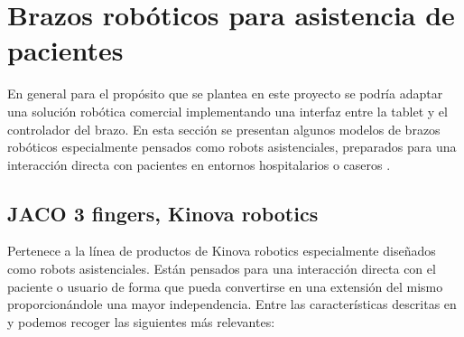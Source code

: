 \section{Brazos robóticos para asistencia de pacientes}

	En general para el propósito que se plantea en este proyecto se podría adaptar una solución robótica comercial implementando una interfaz entre la tablet y el controlador del brazo. En esta sección se presentan algunos modelos de brazos robóticos especialmente pensados como robots asistenciales, preparados para una interacción directa con pacientes en entornos hospitalarios o caseros .

 \subsection{JACO 3 fingers, Kinova robotics}
	 Pertenece a la línea de productos de Kinova robotics especialmente diseñados como robots asistenciales. Están pensados para una interacción directa con el paciente o usuario de forma que pueda convertirse en una extensión del mismo proporcionándole una mayor independencia. Entre las características descritas en \cite{Jaco:2018} y \cite{JacoWeb:2018} podemos recoger las siguientes más relevantes:
     \\

